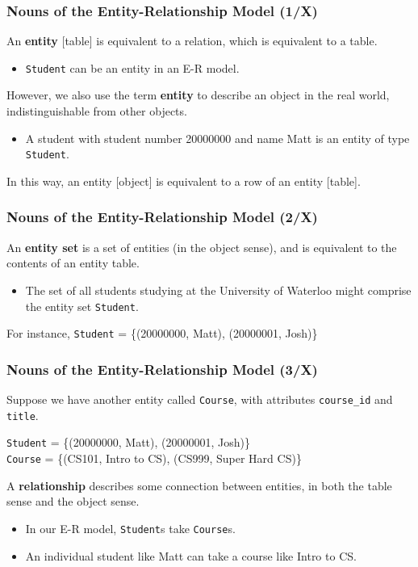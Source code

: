 \begin{frame}
\frametitle{Nouns of the Entity-Relationship Model (1/X)}

An \textbf{entity} [table] is equivalent to a relation, which is equivalent to a table.\\
\begin{itemize}
\item \texttt{Student} can be an entity in an E-R model.
\end{itemize}

However, we also use the term \textbf{entity} to describe an object in the real world, indistinguishable from other objects.\\
\begin{itemize}
\item A student with student number 20000000 and name Matt is an entity of type \texttt{Student}.
\end{itemize}

In this way, an entity [object] is equivalent to a row of an entity [table].

\end{frame}


\begin{frame}
\frametitle{Nouns of the Entity-Relationship Model (2/X)}

An \textbf{entity set} is a set of entities (in the object sense), and is equivalent to the contents of an entity table.\\
\begin{itemize}
\item The set of all students studying at the University of Waterloo might comprise the entity set \texttt{Student}.
\end{itemize}

For instance, \texttt{Student} = \{(20000000, Matt), (20000001, Josh)\}

\end{frame}


\begin{frame}
\frametitle{Nouns of the Entity-Relationship Model (3/X)}

Suppose we have another entity called \texttt{Course}, with attributes \texttt{course\_id} and \texttt{title}.

\texttt{Student} = \{(20000000, Matt), (20000001, Josh)\}\\
\texttt{Course} = \{(CS101, Intro to CS), (CS999, Super Hard CS)\}

A \textbf{relationship} describes some connection between entities, in both the table sense and the object sense.\\
\begin{itemize}
\item In our E-R model, \texttt{Student}s take \texttt{Course}s.
\item An individual student like Matt can take a course like Intro to CS.
\end{itemize}
\end{frame}

